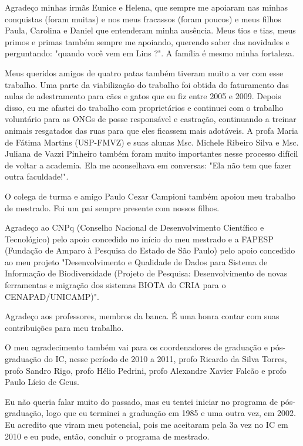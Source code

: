 Agradeço minhas irmãs Eunice e Helena, que sempre me apoiaram nas minhas conquistas (foram muitas) e nos meus fracassos (foram poucos) e meus filhos Paula, Carolina e Daniel que entenderam minha ausência. Meus tios e tias, meus primos e primas também sempre me apoiando, querendo saber das novidades e perguntando: "quando você vem em Lins ?". A família é mesmo minha fortaleza.

Meus queridos amigos de quatro patas também tiveram muito a ver com esse trabalho. Uma parte da viabilização do trabalho foi obtida do faturamento das aulas de adestramento para cães e gatos que eu fiz entre 2005 e 2009. Depois disso, eu me afastei do trabalho com proprietários e continuei com o trabalho voluntário para as ONGs de posse responsável e castração, continuando a treinar animais resgatados das ruas para que eles ficassem mais adotáveis. A profa Maria de Fátima Martins (USP-FMVZ) e suas alunas Msc. Michele Ribeiro Silva e Msc. Juliana de Vazzi Pinheiro também foram muito importantes nesse processo difícil de voltar a academia. Ela me aconselhava em conversas: "Ela não tem que fazer outra faculdade!".

O colega de turma e amigo Paulo Cezar Campioni também apoiou meu trabalho de mestrado. Foi um pai sempre presente com nossos filhos.

Agradeço ao CNPq (Conselho Nacional de Desenvolvimento Científico e Tecnológico) pelo apoio concedido no início do meu mestrado e a FAPESP (Fundação de Amparo à Pesquisa do Estado de São Paulo) pelo apoio concedido ao meu projeto "Desenvolvimento e Qualidade de Dados para Sistema de Informação de Biodiversidade (Projeto de Pesquisa: Desenvolvimento de novas ferramentas e migração dos sistemas BIOTA do CRIA para o CENAPAD/UNICAMP)".

Agradeço aos professores, membros da banca. É uma honra contar com suas contribuições para meu trabalho.

O meu agradecimento também vai para os coordenadores de graduação e pós-graduação do IC, nesse período de 2010 a 2011, profo Ricardo da Silva Torres, profo Sandro Rigo, profo Hélio Pedrini, profo Alexandre Xavier Falcão e profo Paulo Lício de Geus.

Eu não queria falar muito do passado, mas eu tentei iniciar no programa de pós-graduação, logo que eu terminei a graduação em 1985 e uma outra vez, em 2002. Eu acredito que viram meu potencial, pois me aceitaram pela 3a vez no IC em 2010 e eu pude, então, concluir o programa de mestrado.

